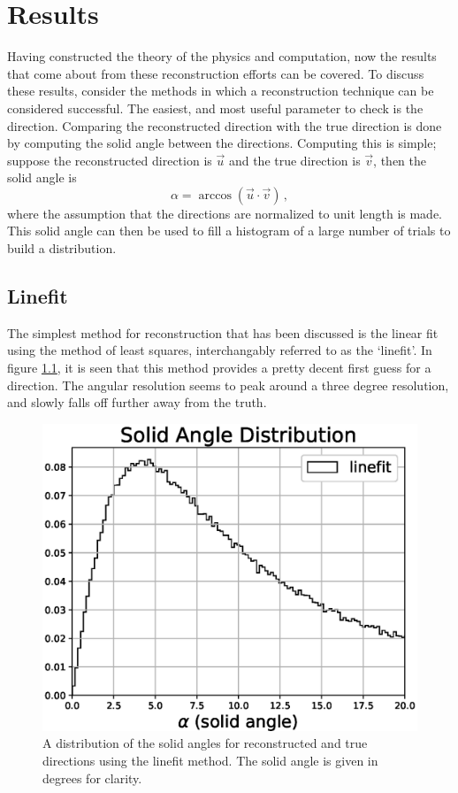 \chapter{Results}

Having constructed the theory of the physics and computation, now the results that come about from these reconstruction efforts can be covered. To discuss these results, consider the methods in which a reconstruction technique can be considered successful. The easiest, and most useful parameter to check is the direction. Comparing the reconstructed direction with the true direction is done by computing the solid angle between the directions. Computing this is simple; suppose the reconstructed direction is $\vec{u}$ and the true direction is $\vec{v}$, then the solid angle is
\begin{equation}
  \alpha = \arccos(\vec{u}\cdot\vec{v})\, ,
\end{equation}
where the assumption that the directions are normalized to unit length is made. This solid angle can then be used to fill a histogram of a large number of trials to build a distribution. 

\section{Linefit}

The simplest method for reconstruction that has been discussed is the linear fit using the method of least squares, interchangably referred to as the `linefit'. In figure \ref{fig:alpha_linefit}, it is seen that this method provides a pretty decent first guess for a direction. The angular resolution seems to peak around a three degree resolution, and slowly falls off further away from the truth. 

\begin{figure}[H]
  \centering
  \includegraphics[width=12cm]{./Figures/reco_plots/alpha_dist_linefit_norm.eps}
  \caption{A distribution of the solid angles for reconstructed and true directions using the linefit method. The solid angle is given in degrees for clarity.}
  \label{fig:alpha_linefit}
\end{figure}

